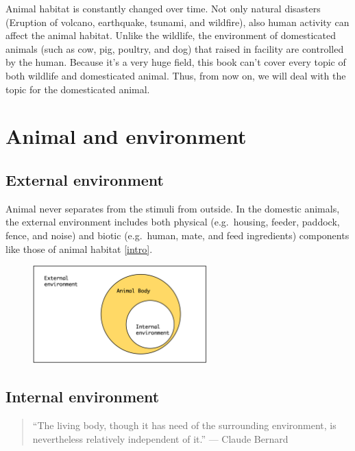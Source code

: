 \documentclass[]{book}
\begin{document}
Animal habitat is constantly changed over time. Not only natural
disasters (Eruption of volcano, earthquake, tsunami, and wildfire), also
human activity can affect the animal habitat. Unlike the wildlife, the
environment of domesticated animals (such as cow, pig, poultry, and dog)
that raised in facility are controlled by the human. Because it's a very
huge field, this book can't cover every topic of both wildlife and
domesticated animal. Thus, from now on, we will deal with the topic for
the domesticated animal.

\chapter{Animal and environment}\label{chapter2}

\section{External environment}\label{external-environment}

Animal never separates from the stimuli from outside. In the domestic
animals, the external environment includes both physical (e.g.~housing,
feeder, paddock, fence, and noise) and biotic (e.g.~human, mate, and
feed ingredients) components like those of animal habitat \ref{intro}.

\begin{figure}
\centering
\includegraphics[width=0.60000\textwidth]{figures/animal-env.png}
\caption{}
\end{figure}

\section{Internal environment}\label{internal-environment}

\begin{quote}
``The living body, though it has need of the surrounding environment, is
nevertheless relatively independent of it.'' --- Claude Bernard
\end{quote}
\end{document}
